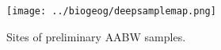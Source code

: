 \begin{figure}
  \centering
  \texttt{[image: ../biogeog/deepsamplemap.png]}
  \caption[Map showing sites of preliminary \ac{AABW} samples]{Sites of preliminary \ac{AABW} samples.}
  \label{fig:deepsamplemap}
\end{figure}
